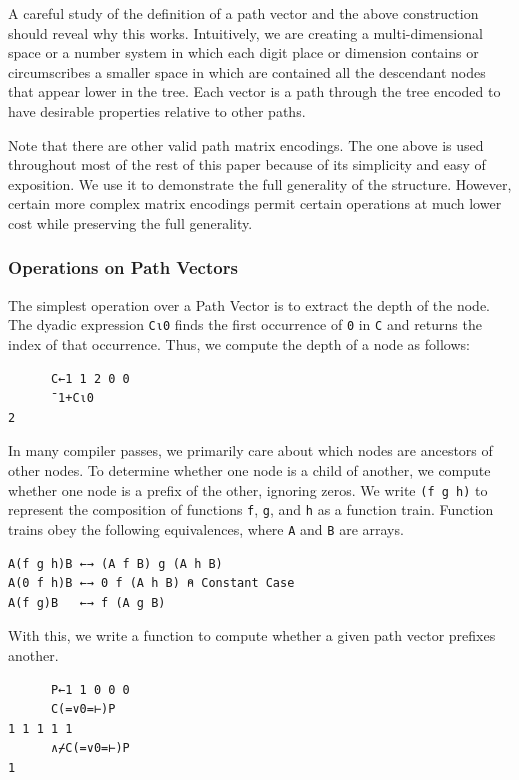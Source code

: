 ﻿\documentclass[numbers,10pt,preprint]{sigplanconf}
\begin{document}
A careful study of the definition of a path vector and the above construction should reveal why this works. Intuitively, we are creating a multi-dimensional space or a number system in which each digit place or dimension contains or circumscribes a smaller space in which are contained all the descendant nodes that appear lower in the tree. Each vector is a path through the tree encoded to have desirable properties relative to other paths.

Note that there are other valid path matrix encodings. The one above is used throughout most of the rest of this paper because of its simplicity and easy of exposition. We use it to demonstrate the full generality of the structure. However, certain more complex matrix encodings permit certain operations at much lower cost while preserving the full generality. 

\subsubsection{Operations on Path Vectors}

The simplest operation over a Path Vector is to extract the depth of the node. The dyadic expression \verb;C⍳0; finds the first occurrence of \verb;0; in \verb;C; and returns the index of that occurrence. Thus, we compute the depth of a node as follows:

\begin{verbatim}
      C←1 1 2 0 0
      ¯1+C⍳0
2
\end{verbatim}

\noindent In many compiler passes, we primarily care about which nodes are ancestors of other nodes. To determine whether one node is a child of another, we compute whether one node is a prefix of the other, ignoring zeros. We write \verb;(f g h); to represent the composition of functions \verb;f;, \verb;g;, and \verb;h; as a function train. Function trains obey the following equivalences, where \verb;A; and \verb;B; are arrays.

\begin{verbatim}
A(f g h)B ←→ (A f B) g (A h B)
A(0 f h)B ←→ 0 f (A h B) ⍝ Constant Case
A(f g)B   ←→ f (A g B)
\end{verbatim}

\noindent With this, we write a function to compute whether a given path vector prefixes another.

\begin{verbatim}
      P←1 1 0 0 0
      C(=∨0=⊢)P
1 1 1 1 1
      ∧⌿C(=∨0=⊢)P
1
\end{verbatim}
\end{document}
